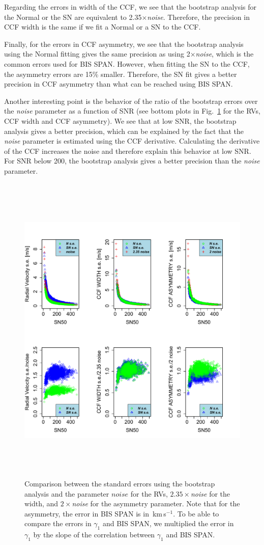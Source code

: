 \documentclass[11pt, oneside]{article}
\def\kms{\hbox{\,km\,s$^{-1}$}}       %
\begin{document}
Regarding the errors in width of the CCF, we see that the bootstrap analysis for the Normal or the SN are equivalent to 2.35$\times$\emph{noise}. Therefore, the precision in CCF width is the same if we fit a Normal or a SN to the CCF.

Finally, for the errors in CCF asymmetry, we see that the bootstrap analysis using the Normal fitting gives the same precision as using 2$\times$\emph{noise}, which is the common errors used for BIS SPAN. However, when fitting the SN to the CCF, the asymmetry errors are 15\% smaller. Therefore, the SN fit gives a better precision in CCF asymmetry than what can be reached using BIS SPAN.

Another interesting point is the behavior of the ratio of the bootstrap errors over the \emph{noise} parameter as a function of SNR (see bottom plots in Fig.~\ref{fig:se} for the RVs, CCF width and CCF asymmetry). We see that at low SNR, the bootstrap analysis gives a better precision, which can be explained by the fact that the \emph{noise} parameter is estimated using the CCF derivative. Calculating the derivative of the CCF increases the noise and therefore explain this behavior at low SNR. For SNR below 200, the bootstrap analysis gives a better precision than the \emph{noise} parameter.
%
\begin{figure}[htbp]
   \centering
\includegraphics[height = 6in]{[5]Errors_vs_SNR_all_stars.pdf} 
   \caption{Comparison between the standard errors using the bootstrap analysis and the parameter $noise$ for the RVs, $2.35\times$\emph{noise} for the width, and $2\times$\emph{noise} for the asymmetry parameter. Note that for the asymmetry, the error in BIS SPAN is in \kms. To be able to compare the errors in $\gamma_1$ and BIS SPAN, we multiplied the error in $\gamma_1$ by the slope of the correlation between $\gamma_1$ and BIS SPAN.}
   \label{fig:se}
\end{figure}
\end{document}
